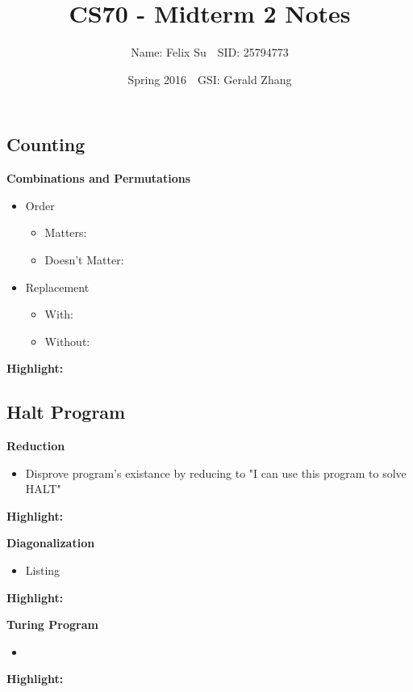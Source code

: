 \documentclass{article}\usepackage{amsmath,amssymb,amsthm,tikz,tkz-graph,color,chngpage,soul,hyperref,csquotes,graphicx,floatrow, listings}\newcommand*{\QEDB}{\hfill\ensuremath{\square}}\newtheorem*{prop}{Proposition}\renewcommand{\theenumi}{\alph{enumi}}\usepackage[shortlabels]{enumitem}\usepackage[nobreak=true]{mdframed}\usetikzlibrary{matrix,calc}\MakeOuterQuote{"}\usepackage[margin=0.75in]{geometry} \newtheorem{theorem}{Theorem}\newcommand{\Z}{\mathbb Z}\newcommand{\R}{\mathbb R}\newcommand{\Q}{\mathbb Q}\newcommand{\N}{\mathbb N}\newcommand{\x}[1]{\textrm{ #1 }}\newcommand{\pr}{\textrm{Pr}}
\title{CS70 - Midterm 2 Notes}
\author{Name: Felix Su$\quad$SID: 25794773}
\date{Spring 2016$\quad$GSI: Gerald Zhang}
\begin{document}
\maketitle

\subsection*{Counting}
\textbf{Combinations and Permutations}
\begin{itemize}
    \item Order
    \begin{itemize}
        \item Matters:
        \item Doesn't Matter:
    \end{itemize}
    \item Replacement
    \begin{itemize}
        \item With:
        \item Without:
    \end{itemize}
\end{itemize}
\begin{mdframed}
\textbf{Highlight:}
\end{mdframed}

\subsection*{Halt Program}
\textbf{Reduction}
\begin{itemize}
    \item Disprove program's existance by reducing to "I can use this program to solve HALT"
\end{itemize}
\begin{mdframed}
\textbf{Highlight:}
\end{mdframed}
\textbf{Diagonalization}
\begin{itemize}
    \item Listing
\end{itemize}
\begin{mdframed}
\textbf{Highlight:}
\end{mdframed}
\textbf{Turing Program}
\begin{itemize}
    \item 
\end{itemize}
\begin{mdframed}
\textbf{Highlight:}
\end{mdframed}
\end{document}
